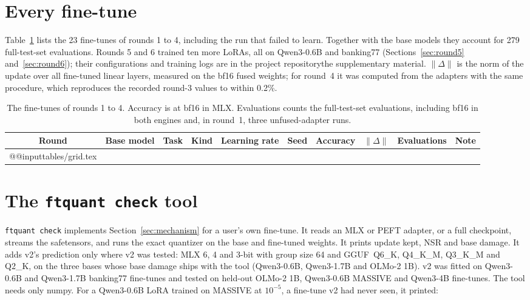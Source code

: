 \documentclass[10pt]{article}
\makeatletter
\newcommand*{\tablerows}[1]{\csname @@input\endcsname #1 }
\newcommand{\suppname}{\ifdefined\tmlrpreprint the project repository\else the supplementary material\fi}
\makeatother
\begin{document}
\clearpage
\section{Every fine-tune}
\label{app:runs}

Table~\ref{tab:grid} lists the 23 fine-tunes of rounds 1 to 4, including the run that failed to learn. Together with the base models they account for 279 full-test-set evaluations. Rounds 5 and 6 trained ten more LoRAs, all on Qwen3-0.6B and banking77 (Sections~\ref{sec:round5} and~\ref{sec:round6}); their configurations and training logs are in \suppname. $\lVert\Delta\rVert$ is the norm of the update over all fine-tuned linear layers, measured on the bf16 fused weights; for round~4 it was computed from the adapters with the same procedure, which reproduces the recorded round-3 values to within 0.2\%.

\begin{table}[htbp]
\centering\footnotesize
\caption{The fine-tunes of rounds 1 to 4. Accuracy is at bf16 in MLX. Evaluations counts the full-test-set evaluations, including bf16 in both engines and, in round~1, three unfused-adapter runs.}
\label{tab:grid}
\begin{tabular}{clllllrrrl}
\toprule
Round & Base model & Task & Kind & Learning rate & Seed & Accuracy & $\lVert\Delta\rVert$ & Evaluations & Note \\
\midrule
\tablerows{tables/grid.tex}
\bottomrule
\end{tabular}
\end{table}

\clearpage
\section{The \texttt{ftquant check} tool}
\label{app:tool}\label{sec:tool}

\texttt{ftquant check} implements Section~\ref{sec:mechanism} for a user's own fine-tune. It reads an MLX or PEFT adapter, or a full checkpoint, streams the safetensors, and runs the exact quantizer on the base and fine-tuned weights. It prints update kept, NSR and base damage. It adds v2's prediction only where v2 was tested: MLX 6, 4 and 3-bit with group size 64 and GGUF~Q6\_K, Q4\_K\_M, Q3\_K\_M and Q2\_K, on the three bases whose base damage ships with the tool (Qwen3-0.6B, Qwen3-1.7B and OLMo-2 1B). v2 was fitted on Qwen3-0.6B and Qwen3-1.7B banking77 fine-tunes and tested on held-out OLMo-2 1B, Qwen3-0.6B MASSIVE and Qwen3-4B fine-tunes. The tool needs only numpy. For a Qwen3-0.6B LoRA trained on MASSIVE at $10^{-5}$, a fine-tune v2 had never seen, it printed:
\end{document}
